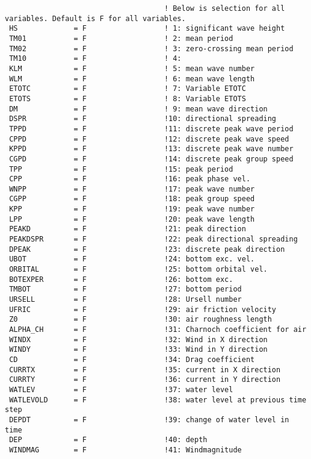 \documentclass[12pt]{amsart}
\begin{document}
\begin{verbatim}
                                     ! Below is selection for all variables. Default is F for all variables.
 HS             = F                  ! 1: significant wave height
 TM01           = F                  ! 2: mean period
 TM02           = F                  ! 3: zero-crossing mean period
 TM10           = F                  ! 4: 
 KLM            = F                  ! 5: mean wave number
 WLM            = F                  ! 6: mean wave length
 ETOTC          = F                  ! 7: Variable ETOTC
 ETOTS          = F                  ! 8: Variable ETOTS
 DM             = F                  ! 9: mean wave direction
 DSPR           = F                  !10: directional spreading
 TPPD           = F                  !11: discrete peak wave period
 CPPD           = F                  !12: discrete peak wave speed
 KPPD           = F                  !13: discrete peak wave number
 CGPD           = F                  !14: discrete peak group speed
 TPP            = F                  !15: peak period  
 CPP            = F                  !16: peak phase vel. 
 WNPP           = F                  !17: peak wave number
 CGPP           = F                  !18: peak group speed
 KPP            = F                  !19: peak wave number
 LPP            = F                  !20: peak wave length 
 PEAKD          = F                  !21: peak direction
 PEAKDSPR       = F                  !22: peak directional spreading
 DPEAK          = F                  !23: discrete peak direction 
 UBOT           = F                  !24: bottom exc. vel. 
 ORBITAL        = F                  !25: bottom orbital vel. 
 BOTEXPER       = F                  !26: bottom exc.  
 TMBOT          = F                  !27: bottom period 
 URSELL         = F                  !28: Ursell number
 UFRIC          = F                  !29: air friction velocity
 Z0             = F                  !30: air roughness length
 ALPHA_CH       = F                  !31: Charnoch coefficient for air
 WINDX          = F                  !32: Wind in X direction
 WINDY          = F                  !33: Wind in Y direction
 CD             = F                  !34: Drag coefficient
 CURRTX         = F                  !35: current in X direction
 CURRTY         = F                  !36: current in Y direction
 WATLEV         = F                  !37: water level
 WATLEVOLD      = F                  !38: water level at previous time step
 DEPDT          = F                  !39: change of water level in time
 DEP            = F                  !40: depth
 WINDMAG        = F                  !41: Windmagnitude

\end{verbatim}
\end{document}
